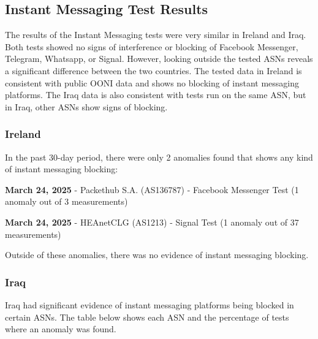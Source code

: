 \subsection{Instant Messaging Test Results}

The results of the Instant Messaging tests were very similar in Ireland and Iraq. Both tests showed no signs of interference or blocking of Facebook Messenger, Telegram, Whatsapp, or Signal. However, looking outside the tested ASNs reveals a significant difference between the two countries. The tested data in Ireland is consistent with public OONI data and shows no blocking of instant messaging platforms. The Iraq data is also consistent with tests run on the same ASN, but in Iraq, other ASNs show signs of blocking.

\subsubsection{Ireland}

In the past 30-day period, there were only 2 anomalies found that shows any kind of instant messaging blocking:

\textbf{March 24, 2025} - Packethub S.A. (AS136787) - Facebook Messenger Test (1 anomaly out of 3 measurements)

\textbf{March 24, 2025} - HEAnetCLG (AS1213) - Signal Test (1 anomaly out of 37 measurements)

Outside of these anomalies, there was no evidence of instant messaging blocking.

\subsubsection{Iraq}

Iraq had significant evidence of instant messaging platforms being blocked in certain ASNs. The table below shows each ASN and the percentage of tests where an anomaly was found.

\vspace{2em}

